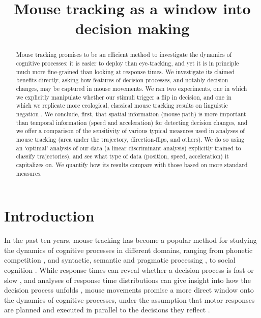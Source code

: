 \documentclass[11pt]{article}
\title{Mouse tracking as a window into decision making}
\date{}
\begin{document}
\maketitle

\begin{abstract}
Mouse tracking promises to be an efficient method to investigate the dynamics of cognitive processes: it is easier to deploy than eye-tracking, and yet it is in principle much more fine-grained than looking at response times.
We investigate its claimed benefits directly, asking how features of decision processes, and notably decision changes, may be captured in mouse movements. 
We ran two experiments, one in which we explicitly manipulate whether our stimuli trigger a flip in decision, and one in which we replicate more ecological, classical mouse tracking results on linguistic negation \citep{Dale2011}.
We conclude, first, that spatial information (mouse path) is more important than temporal information (speed and acceleration) for detecting decision changes, and we offer a comparison of the sensitivity of various typical measures used in analyses of mouse tracking (area under the trajectory, direction-flips, and others). We do so using an `optimal' analysis of our data (a linear discriminant analysis) explicitly trained to classify trajectories), and see what type of data (position, speed, acceleration) it capitalizes on. We quantify how its results compare with those based on more standard measures.

\end{abstract}




\section{Introduction}

In the past ten years, mouse tracking has become a popular method for studying the dynamics of cognitive processes in different domains, ranging from phonetic competition \citep{Spivey2005,cranford2017mouse}, and syntactic, semantic and pragmatic processing \citep[among others]{Farmer2007, Dale2011, tomlinson2013possibly,xiao2014semantic,sauerland2015tracking,xiao2017role}, to social cognition \citep{Freeman2010,Freeman2011,freeman2016more}.
While response times can reveal whether a decision process is fast or slow \citep{donders1969speed}, and analyses of response time distributions can give insight into how the decision process unfolds \citep[among others]{usher2001time,ratcliff2008diffusion}, mouse movements promise a more direct window onto the dynamics of cognitive processes, under the assumption that motor responses are planned and executed in parallel to the decisions they reflect \citep{song2006role,Song2009,Freeman2010,spivey2006continuous,Hehman2014}.
\end{document}
